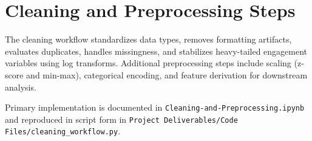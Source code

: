 \section{Cleaning and Preprocessing Steps}

The cleaning workflow standardizes data types, removes formatting artifacts, evaluates duplicates, handles missingness, and stabilizes heavy-tailed engagement variables using log transforms. Additional preprocessing steps include scaling (z-score and min-max), categorical encoding, and feature derivation for downstream analysis.

Primary implementation is documented in \texttt{Cleaning-and-Preprocessing.ipynb} and reproduced in script form in \texttt{Project Deliverables/Code Files/cleaning\_workflow.py}.

